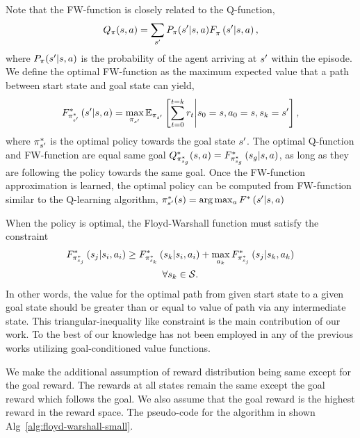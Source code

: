 Note that the FW-function is closely related to the Q-function,
\begin{align}
  \Q_\policy(\state, \act) = \sum_{\state'} P_\policy(\state' | \state, \act) \fwargs{\state}{\act}{\state'}{\policy}{},
\end{align}%
%
where $P_\policy(\state' | \state, \act)$ is the probability of the agent
arriving at $\state'$ within the episode. We define the optimal FW-function as
the maximum expected value that a path between start state and goal state can
yield,
\begin{align}
\fwargs{\state}{\act}{\state'}{\policy^*_{\state'}}{*} =
\max_{\policy_{\state'}}\E_{\policy_{\state'}}\left[ \sum_{t=0}^{t=k} \rew_t \middle\vert \state_0 = \state, \act_0 = \state, \state_k = \state' \right] ,
\end{align}%
where $\policy^*_{\state'}$ is the
optimal policy towards the goal state $\state'$. The optimal Q-function and
FW-function are equal same goal
$\Q^*_{\policy^*_{\state_g}}(\state, \act) =
  \fwargs{\state}{\act}{\state_g}{\policy^*_{\state_g}}{*}$,
as long as they are following the policy towards the same goal. Once the
FW-function approximation is learned, the optimal policy can be computed from
FW-function similar to the Q-learning algorithm, $\policy^*_{\state'}(\state) =
\arg \max_{\act} \fwargs{\state}{\act}{\state'}{}{*}$

When the policy is optimal, the Floyd-Warshall function must satisfy the
constraint
%
\begin{multline}
\fwargs{\state_i}{\act_i}{\state_j}{\policy^*_{\state_j}}{*}
 \ge 
  \fwargs{\state_i}{\act_i}{\state_k}{\policy^*_{\state_k}}{*}
  + \max_{\act_k}\fwargs{\state_k}{\act_k}{\state_j}{\policy^*_{\state_j}}{*}
  \\
  \forall \state_k \in \State.
\end{multline}%
%
In other words, the value for the optimal path from given start state to a given
goal state should be greater than or equal to value of path via any intermediate
state.
This triangular-inequality like constraint is the main contribution of our work.
To the best of our knowledge has not been employed in any of the previous works
utilizing goal-conditioned value functions.

We make the additional assumption of reward distribution being same except for
the goal reward. The rewards at all states remain the same except the goal
reward which follows the goal. We also assume that the goal reward is the
highest reward in the reward space.
The pseudo-code for the algorithm in shown Alg~\ref{alg:floyd-warshall-small}.




